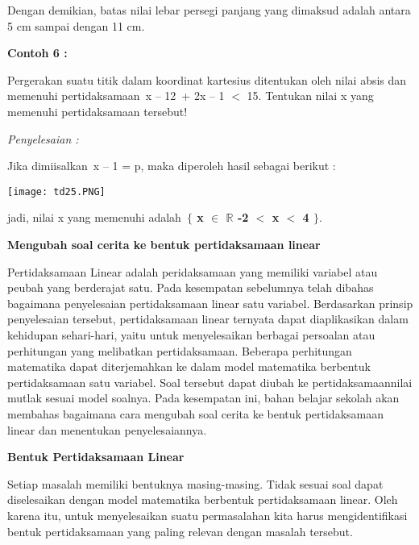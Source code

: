 \documentclass[11pt,fleqn]{book} %
\begin{document}
\noindent Dengan demikian, batas nilai lebar persegi panjang yang dimaksud adalah antara 5 cm sampai dengan 11 cm.

\noindent \textbf{Contoh 6 :}

\noindent Pergerakan suatu titik dalam koordinat kartesius ditentukan oleh nilai absis dan memenuhi pertidaksamaan~{\textbar}x -- 1{\textbar}2~+ 2{\textbar}x -- 1{\textbar} $<$ 15. Tentukan nilai x yang memenuhi pertidaksamaan tersebut!

\noindent \textit{Penyelesaian :}

\noindent Jika dimiisalkan~{\textbar}x -- 1{\textbar} = p, maka diperoleh hasil sebagai berikut :

\noindent \texttt{[image: td25.PNG]}\textbf{}

\noindent jadi, nilai x yang memenuhi adalah~\textbf{$\boldsymbol{\{}$ x $\boldsymbol{\mathrm{\in }}$ $\boldsymbol{\mathrm{\mathbb{R}}}$ {\textbar} -2 $\boldsymbol{<}$ x $\boldsymbol{<}$ 4 $\boldsymbol{\}}$}.

\noindent \textbf{}

\noindent \textbf{Mengubah soal cerita ke bentuk pertidaksamaan linear}

\noindent Pertidaksamaan Linear adalah peridaksamaan yang memiliki variabel atau peubah yang berderajat satu. Pada kesempatan sebelumnya telah dibahas bagaimana penyelesaian pertidaksamaan linear satu variabel. Berdasarkan prinsip penyelesaian tersebut, pertidaksamaan linear ternyata dapat diaplikasikan dalam kehidupan sehari-hari, yaitu untuk menyelesaikan berbagai persoalan atau perhitungan yang melibatkan pertidaksamaan. Beberapa perhitungan matematika dapat diterjemahkan ke dalam model matematika berbentuk pertidaksamaan satu variabel. Soal tersebut dapat diubah ke pertidaksamaannilai mutlak sesuai model soalnya. Pada kesempatan ini, bahan belajar sekolah akan membahas bagaimana cara mengubah soal cerita ke bentuk pertidaksamaan linear dan menentukan penyelesaiannya.

\noindent \textbf{Bentuk Pertidaksamaan Linear}

Setiap masalah memiliki bentuknya masing-masing. Tidak sesuai soal dapat diselesaikan dengan model matematika berbentuk pertidaksamaan linear. Oleh karena itu, untuk menyelesaikan suatu permasalahan kita harus mengidentifikasi bentuk pertidaksamaan yang paling relevan dengan masalah tersebut.
\end{document}
